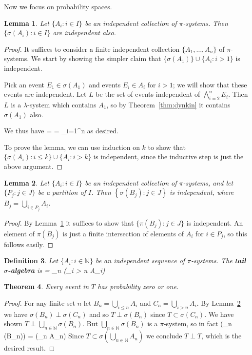 \documentclass[11pt,a4paper]{article}
\newtheorem{theorem}{Theorem}
\newtheorem{lemma}[theorem]{Lemma}
\newtheorem{definition}[theorem]{Definition}
\newcommand*{\defn}[1]{\textbf{#1}}
\newcommand*{\N}[0]{\mathbb{N}}
\def\[#1\]{\begin{align*}#1\end{align*}}
\begin{document}
Now we focus on probability spaces.

\begin{lemma}
  \label{lem:pi ind}
  Let $\{A_i : i \in I\}$ be an independent collection of $\pi$-systems.
  Then $\{\sigma(A_i) : i \in I\}$ are independent also.
\end{lemma}
\begin{proof}
  It suffices to consider a finite independent collection $\{A_1, \dots, A_n\}$ of $\pi$-systems.
  We start by showing the simpler claim that $\{\sigma(A_1)\} \cup \{A_i : i > 1\}$ is independent.

  Pick an event $E_1 \in \sigma(A_1)$
  and events $E_i \in A_i$ for $i > 1$; we will show that these events are independent.
  Let $L$ be the set of events independent of $\bigwedge_{i=2}^n E_i$.
  Then $L$ is a $\lambda$-system which contains $A_1$, so by Theorem~\ref{thm:dynkin} it contains $\sigma(A_1)$ also.

  We thus have
  \[
  \Pr\left[\bigwedge_{i=1}^n E_i\right]
   = \Pr[E_1]\Pr\left[\bigwedge_{i=2}^n E_i\right]
   = \prod_{i=1}^{n} \Pr[E_i]
  \]
  as desired.

  To prove the lemma, we can use induction on $k$ to show that $\{\sigma(A_i) : i \le k\} \cup \{A_i : i > k\}$ is independent, since the inductive step is just the above argument.
\end{proof}

\begin{lemma}
  \label{lem:partition ind}
  Let $\{A_i : i \in I\}$ be an independent collection of $\pi$-systems,
  and let $\{P_j : j \in J\}$ be a partition of $I$.
  Then $\left\{\sigma(B_j) : j \in J\right\}$ is independent, where $B_j = \bigcup_{i \in P_j} A_i$.
\end{lemma}
\begin{proof}
  By Lemma~\ref{lem:pi ind} it suffices to show that
  $\{\pi(B_j) : j \in J\}$ is independent.
  An element of $\pi(B_j)$ is just a finite intersection
  of elements of $A_i$ for $i \in P_j$,
  so this follows easily.
\end{proof}

\begin{definition}
  Let $\{A_i : i \in \N\}$ be an independent sequence of $\pi$-systems.
  The \defn{tail $\sigma$-algebra} is \[T = \bigcap_{n \in \N} \sigma\left(\bigcup_{i > n} A_i\right)\]
\end{definition}

\begin{theorem}
  Every event in $T$ has probability zero or one.
\end{theorem}
\begin{proof}
  For any finite set $n$ let $B_n = \bigcup_{i \le n} A_i$ and $C_n = \bigcup_{i > n} A_i$.
  By Lemma~\ref{lem:partition ind} we have $\sigma(B_n) \perp \sigma(C_n)$ and so $T \perp \sigma(B_n)$ since $T \subset \sigma(C_n)$.
  We have shown $T \perp \bigcup_{n \in \N} \sigma(B_n)$.  But $\bigcup_{n \in \N} \sigma(B_n)$ is a $\pi$-system, so in fact
  \[T \perp \sigma\left(\bigcup_{n \in \N} \sigma(B_n)\right) = \sigma\left(\bigcup_{n \in \N} A_n\right)\]
  Since $T \subset \sigma\left(\bigcup_{n \in \N} A_n\right)$
  we conclude $T \perp T$, which is the desired result.
\end{proof}
\end{document}

